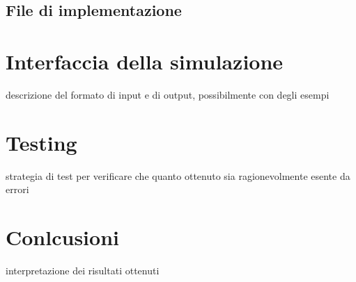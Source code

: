 \documentclass[12pt,a4paper]{article}
\begin{document}
\subsection{File di implementazione}



\section{Interfaccia della simulazione}
descrizione del formato di input e di output, possibilmente con degli esempi

\section{Testing}
strategia di test per verificare che quanto ottenuto sia ragionevolmente esente da errori

\section{Conlcusioni}
interpretazione dei risultati ottenuti
\end{document}
